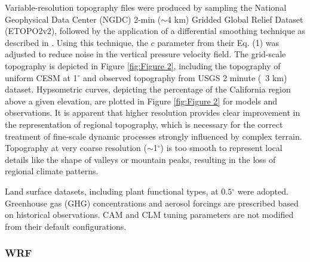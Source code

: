 \documentclass[ms,draft]{agutex}   %
\begin{document}
\begin{article}
Variable-resolution topography files were produced by sampling the National Geophysical Data Center (NGDC) 2-min ($\sim$4 km) Gridded Global Relief Dataset (ETOPO2v2), followed by the application of a differential smoothing technique as described in \cite{zarzycki2015effects}.  Using this technique, the $c$ parameter from their Eq. (1) was adjusted to reduce noise in the vertical pressure velocity field. The grid-scale topography is depicted in Figure \ref{fig:Figure 2}, including the topography of uniform CESM at 1$^\circ$ and observed topography from USGS 2 minute (~3 km) dataset. Hypsometric curves, depicting the percentage of the California region above a given elevation, are plotted in Figure \ref{fig:Figure 2} for models and observations. It is apparent that higher resolution provides clear improvement in the representation of regional topography, which is necessary for the correct treatment of fine-scale dynamic processes strongly influenced by complex terrain. Topography at very coarse resolution ($\sim$1$^\circ$) is too smooth to represent local details like the shape of valleys or mountain peaks, resulting in the loss of regional climate patterns.

Land surface datasets, including plant functional types, at $0.5$$^\circ$ were adopted. Greenhouse gas (GHG) concentrations and aerosol forcings are prescribed based on historical observations. CAM and CLM tuning parameters are not modified from their default configurations.


\subsubsection{WRF} 


\end{article}
\end{document}
